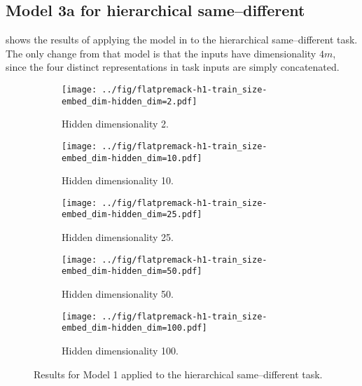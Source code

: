 \newpage


\subsection{Model 3a for hierarchical same--different}\label{app:model1-premack}

 shows the results of applying the model in  to the hierarchical same--different task.  The only change from that model is that the inputs have dimensionality $4m$, since the four distinct representations in task inputs are simply concatenated.


\begin{figure}[H]
  \centering

  \begin{subfigure}{0.45\linewidth}
    \texttt{[image: ../fig/flatpremack-h1-train\_size-embed\_dim-hidden\_dim=2.pdf]}
    \caption{Hidden dimensionality 2.}
  \end{subfigure}
  \hfill
  \begin{subfigure}{0.45\linewidth}
    \texttt{[image: ../fig/flatpremack-h1-train\_size-embed\_dim-hidden\_dim=10.pdf]}
    \caption{Hidden dimensionality 10.}
  \end{subfigure}

  \vspace{24pt}

  \begin{subfigure}{0.45\linewidth}
    \texttt{[image: ../fig/flatpremack-h1-train\_size-embed\_dim-hidden\_dim=25.pdf]}
    \caption{Hidden dimensionality 25.}
  \end{subfigure}
  \hfill
  \begin{subfigure}{0.45\linewidth}
    \texttt{[image: ../fig/flatpremack-h1-train\_size-embed\_dim-hidden\_dim=50.pdf]}
    \caption{Hidden dimensionality 50.}
  \end{subfigure}

  \vspace{24pt}

  \begin{subfigure}{0.45\linewidth}
    \texttt{[image: ../fig/flatpremack-h1-train\_size-embed\_dim-hidden\_dim=100.pdf]}
    \caption{Hidden dimensionality 100.}
  \end{subfigure}
  \caption{Results for Model 1 applied to the hierarchical same--different task. }
  \label{fig:model1:premack}
\end{figure}


